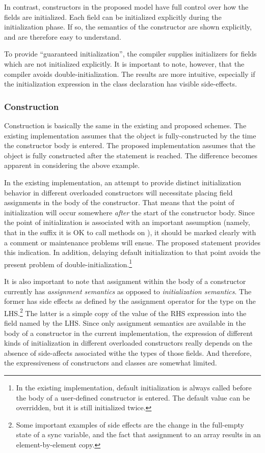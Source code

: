 In contrast, constructors in the proposed model have full control over how the
fields are initialized.  Each field can be initialized explicitly during the
initialization phase.  If so, the semantics of the constructor are shown
explicitly, and are therefore easy to understand.

To provide ``guaranteed initialization'', the compiler supplies initializers for
fields which are not initialized explicitly.  It is important to note, however,
that the compiler avoids double-initialization.  The results are more intuitive,
especially if the initialization expression in the class declaration has visible
side-effects.

\subsubsection{Construction}
Construction is basically the same in the existing and proposed schemes.
The existing implementation assumes that the object is fully-constructed by the
time the constructor body is entered.  The proposed implementation assumes that
the object is fully constructed after the  statement is reached.  The
difference becomes apparent in considering the above example.

In the existing implementation, an attempt to provide distinct
initialization behavior in different overloaded constructors will necessitate placing
field assignments in the body of the constructor.  That means that the point of
initialization will occur somewhere \emph{after} the start of the constructor
body.  Since the point of initialization is associated with an important
assumption (namely, that in the suffix it is OK to call methods on ),
it should be marked clearly with a comment or maintenance problems will ensue.
The proposed  statement provides this indication.  In addition,
delaying default initialization to that point avoids the present problem of
double-initialization.\footnote{In the existing implementation, default
initialization is always called before the body of a user-defined constructor is
entered.  The default value can be overridden, but it is still initialized twice.}

It is also important to note that assignment within the body of a constructor currently
has \emph{assignment semantics} as opposed to \emph{initialization semantics}.
The former has side effects as defined by the assignment operator for the type
on the LHS.\footnote{Some important examples of side effects are the change in the
full-empty state of a sync variable, and the fact that assignment to an array
results in an element-by-element copy.}  The latter is a simple copy of the
value of the RHS expression into the field named by the LHS.  Since only
assignment semantics are available in the body of a constructor in the current
implementation, the expression of different kinds of initialization in different
overloaded constructors really depends on the absence of side-affects associated
withe the types of those fields.  And therefore, the expressiveness of
constructors and classes are somewhat limited.

